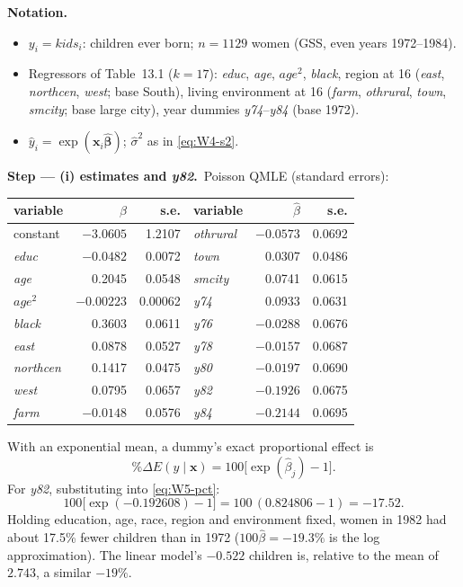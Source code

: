 \documentclass[11pt,a4paper]{article}
\numberwithin{equation}{questao}   %
\newenvironment{notacao}{\par\smallskip\noindent\textbf{Notation.}\begin{itemize}[leftmargin=1.4em,topsep=1pt,itemsep=0pt]\small}{\end{itemize}}
\newcommand{\passo}[2]{\par\smallskip\noindent\textbf{Step --- #1.}~#2}
\begin{document}
\begin{sol}
\begin{notacao}
\item $y_i=\textit{kids}_i$: children ever born; $n=1129$ women (GSS, even years 1972--1984).
\item Regressors of Table~13.1 ($k=17$): \textit{educ}, \textit{age}, $\textit{age}^2$, \textit{black},
  region at 16 (\textit{east}, \textit{northcen}, \textit{west}; base South), living environment at 16
  (\textit{farm}, \textit{othrural}, \textit{town}, \textit{smcity}; base large city), year dummies
  \textit{y74}--\textit{y84} (base 1972).
\item $\hat y_i=\exp(\mathbf x_i\hat{\boldsymbol\beta})$; $\hat\sigma^2$ as in \eqref{eq:W4-s2}.
\end{notacao}

\passo{(i) estimates and \textit{y82}}{Poisson QMLE (standard errors):
\begin{center}\small\begin{tabular}{lrr@{\qquad}lrr}\toprule
variable & $\hat\beta$ & s.e. & variable & $\hat\beta$ & s.e.\\\midrule
constant & $-3.0605$ & 1.2107 & \textit{othrural} & $-0.0573$ & 0.0692\\
\textit{educ} & $-0.0482$ & 0.0072 & \textit{town} & 0.0307 & 0.0486\\
\textit{age} & 0.2045 & 0.0548 & \textit{smcity} & 0.0741 & 0.0615\\
$\textit{age}^2$ & $-0.00223$ & 0.00062 & \textit{y74} & 0.0933 & 0.0631\\
\textit{black} & 0.3603 & 0.0611 & \textit{y76} & $-0.0288$ & 0.0676\\
\textit{east} & 0.0878 & 0.0527 & \textit{y78} & $-0.0157$ & 0.0687\\
\textit{northcen} & 0.1417 & 0.0475 & \textit{y80} & $-0.0197$ & 0.0690\\
\textit{west} & 0.0795 & 0.0657 & \textit{y82} & $-0.1926$ & 0.0675\\
\textit{farm} & $-0.0148$ & 0.0576 & \textit{y84} & $-0.2144$ & 0.0695\\\bottomrule\end{tabular}\end{center}
With an exponential mean, a dummy's exact proportional effect is
\begin{equation}\label{eq:W5-pct}
\%\Delta E(y\mid\mathbf x)=100\big[\exp(\hat\beta_j)-1\big].
\end{equation}
For \textit{y82}, substituting into \eqref{eq:W5-pct}:
\begin{equation}\label{eq:W5-y82}
100\big[\exp(-0.192608)-1\big]=100\,(0.824806-1)=-17.52 .
\end{equation}
Holding education, age, race, region and environment fixed, women in 1982 had about 17.5\% fewer
children than in 1972 ($100\hat\beta=-19.3\%$ is the log approximation). The linear model's
$-0.522$ children is, relative to the mean of $2.743$, a similar $-19\%$.}


\end{sol}
\end{document}
